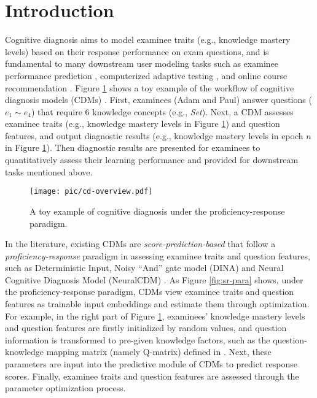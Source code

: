 \documentclass[sigconf]{acmart}
\begin{document}
\section{Introduction}\label{sec:intro}
\par Cognitive diagnosis aims to model examinee traits (e.g., knowledge mastery levels) based on their response performance on exam questions, and is fundamental to many downstream user modeling tasks such as examinee performance prediction \cite{daud2017adv,yao2021pro,gao2022dcd}, computerized adaptive testing \cite{ghosh2021bobcat,wang2023gmocat}, and online course recommendation \cite{yin2020mooc,wang2020pet}. Figure \ref{fig:cd-overview} shows a toy example of the workflow of cognitive diagnosis models (CDMs) \cite{Leighton2007}. First, examinees (Adam and Paul) answer questions ($e_1\sim e_4$) that require 6 knowledge concepts (e.g., \textit{Set}). Next, a CDM assesses examinee traits (e.g., knowledge mastery levels in Figure \ref{fig:cd-overview}) and question features, and output diagnostic results (e.g., knowledge mastery levels in epoch $n$ in Figure \ref{fig:cd-overview}). Then diagnostic results are presented for examinees to quantitatively assess their learning performance and provided for downstream tasks mentioned above. 

\begin{figure}[t]
  \centering
  \texttt{[image: pic/cd-overview.pdf]}
  \vspace{-20pt}
  \caption{A toy example of cognitive diagnosis under the proficiency-response paradigm. }
  \Description{} 
  \label{fig:cd-overview}
  \vspace{-15pt}
\end{figure}

\par In the literature, existing CDMs are \textit{score-prediction-based} that follow a \textit{proficiency-response} paradigm in assessing examinee traits and question features, such as Deterministic Input, Noisy ``And'' gate model (DINA) \cite{Torre2009} and Neural Cognitive Diagnosis Model (NeuralCDM) \cite{WangF2022}. As Figure \ref{fig:sr-para} shows, under the proficiency-response paradigm, CDMs view examinee traits and question features as trainable input embeddings and estimate them through optimization. For example, in the right part of Figure \ref{fig:cd-overview}, examinees' knowledge mastery levels and question features are firstly initialized by random values, and question information is transformed to pre-given knowledge factors, such as the question-knowledge mapping matrix (namely Q-matrix) defined in \cite{Tatsuoka1983}. Next, these parameters are input into the predictive module of CDMs to predict response scores. Finally, examinee traits and question features are assessed through the parameter optimization process.
\end{document}
